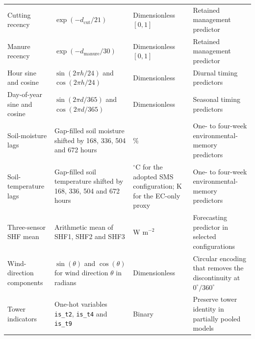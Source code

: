 {\begin{longtable}{p{2.8cm}p{4.4cm}p{2.7cm}p{4.6cm}}
Cutting recency & $\exp(-d_{\mathrm{cut}}/21)$ & Dimensionless $[0,1]$ & Retained management predictor \\
Manure recency & $\exp(-d_{\mathrm{manure}}/30)$ & Dimensionless $[0,1]$ & Retained management predictor \\
Hour sine and cosine & $\sin(2\pi h/24)$ and $\cos(2\pi h/24)$ & Dimensionless & Diurnal timing predictors \\
Day-of-year sine and cosine & $\sin(2\pi d/365)$ and $\cos(2\pi d/365)$ & Dimensionless & Seasonal timing predictors \\
Soil-moisture lags & Gap-filled soil moisture shifted by 168, 336, 504 and 672 hours & \% & One- to four-week environmental-memory predictors \\
Soil-temperature lags & Gap-filled soil temperature shifted by 168, 336, 504 and 672 hours & $^{\circ}$C for the adopted SMS configuration; K for the EC-only proxy & One- to four-week environmental-memory predictors \\
Three-sensor SHF mean & Arithmetic mean of SHF1, SHF2 and SHF3 & W m$^{-2}$ & Forecasting predictor in selected configurations \\
Wind-direction components & $\sin(\theta)$ and $\cos(\theta)$ for wind direction $\theta$ in radians & Dimensionless & Circular encoding that removes the discontinuity at $0^{\circ}/360^{\circ}$ \\
Tower indicators & One-hot variables \texttt{is\_t2}, \texttt{is\_t4} and \texttt{is\_t9} & Binary & Preserve tower identity in partially pooled models \\
\end{longtable}
}

